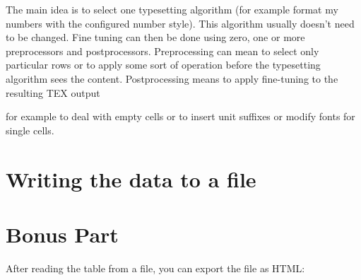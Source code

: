 The main idea is to select one typesetting algorithm (for example format my numbers with the configured
number style). This algorithm usually doesn't need to be changed. Fine tuning can then be done using
zero, one or more preprocessors and postprocessors. Preprocessing can mean to select only particular rows
or to apply some sort of operation before the typesetting algorithm sees the content. Postprocessing means
to apply fine-tuning to the resulting TEX output { for example to deal with empty cells or to insert unit
suffixes or modify fonts for single cells.




\section{Writing the data to a file}


\section{Bonus Part}
\normalsize

After reading the table from a file, you can export the file as HTML:

}
